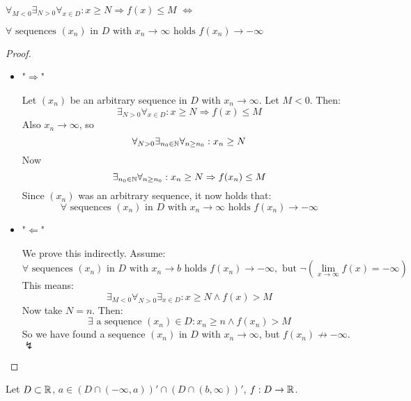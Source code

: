 \documentclass[week=6]{homework}
\begin{document}
\begin{questions}
\begin{parts}
        \begin{toprove}
        	$\forall_{M < 0} \exists_{N > 0} \forall_{x \in D} : x \ge N \Rightarrow f(x) \le M$ $\iff$
        	
        	$\forall \text{ sequences } (x_n) \text{ in } D \text{ with } x_n \to \infty \text{ holds } f(x_n) \to - \infty$
        \end{toprove}
        \begin{proof}
        	
        	\begin{itemize}        		
        		\item "$\Rightarrow$"
        		
        		Let $(x_n)$ be an arbitrary sequence in $D$ with $x_n \to \infty$. Let $M < 0$. Then:
        		\[
	        		\exists_{N > 0} \forall_{x \in D} : x \ge N \Rightarrow f(x) \le M
        		\]
        		Also $x_n \to \infty$, so
        		\[
	        		\forall_{N > 0} \exists_{n_0 \in \mathbb{N}} \forall_{n \ge n_0} : x_n \ge N
        		\]
        		Now 
        		\[
        		\exists_{n_0 \in \mathbb{N}}\forall_{n \ge n_0}:  x_n \ge N \Rightarrow f(x_n) \le M
        		\]
        		Since $(x_n)$ was an arbitrary sequence, it now holds that:
        		\[
	        		\forall \text{ sequences } (x_n) \text{ in } D \text{ with } x_n \to \infty \text{ holds } f(x_n) \to - \infty
        		\]
        		
        		\item "$\Leftarrow$"
        		
        		We prove this indirectly. Assume:
        		\[
	        		\forall \text{ sequences } (x_n) \text{ in } D \text{ with } x_n \to b \text{ holds } f(x_n) \to - \infty, \text{ but } \neg( \lim_{x \to \infty} f(x) = - \infty)
        		\]
        		This means:
        		\[
	        		\exists_{M < 0} \forall_{N > 0} \exists_{x \in D} : x \ge N \wedge f(x) > M
        		\]
        		Now take $N = n$. Then: 
        		\[
	        		\exists \text{ a sequence } (x_n) \in D : x_n \ge n \wedge f(x_n) > M
        		\]
        		So we have found a sequence $(x_n)$ in $D$ with $x_n \to \infty$, but $f(x_n) \not \to - \infty$. $\lightning$
        		
        		
        	\end{itemize}
        \end{proof}	
                      	
        \end{parts}            
        
        \question
        Let $D \subset \mathbb{R}$, $a \in (D \cap (-\infty,a))' \cap (D \cap (b,\infty))'$, $f : D \to \mathbb{R}$. 
        

\end{questions}
\end{document}
